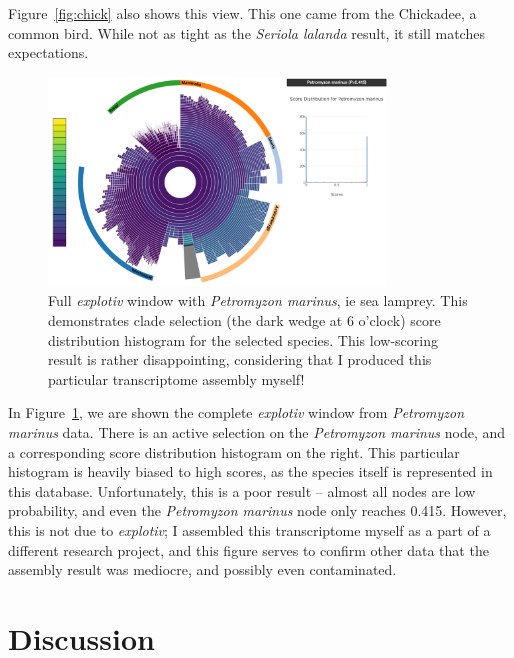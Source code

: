 \documentclass[12pt]{article} %
\begin{document}
Figure~\ref{fig:chick} also shows this view. This one came from the Chickadee, a common bird. While not as tight as the \textit{Seriola lalanda}
result, it still matches expectations.

\begin{figure}[!ht]
  \caption{Full \textit{explotiv} window with  \textit{Petromyzon marinus}, ie sea lamprey. This demonstrates clade
  				selection (the dark wedge at 6 o'clock) score distribution histogram for the selected species. This low-scoring 
  				result is rather disappointing, considering that I produced this particular transcriptome assembly myself!}\label{fig:pmar}
  \centering
    \includegraphics[width=0.8\textwidth]{p_marinus}
\end{figure}

In Figure~\ref{fig:pmar}, we are shown the complete \textit{explotiv} window from \textit{Petromyzon marinus} data. There is an active selection on the \textit{Petromyzon marinus} node,
and a corresponding score distribution histogram on the right. This particular histogram is heavily biased to high scores, as the species itself
is represented in this database. Unfortunately, this is a poor result -- almost all nodes are low probability, and even the \textit{Petromyzon marinus}
node only reaches 0.415. However, this is not due to \textit{explotiv}; I assembled this transcriptome myself as a part of a different research project,
and this figure serves to confirm other data that the assembly result was mediocre, and possibly even contaminated.

\section{Discussion}
\end{document}
